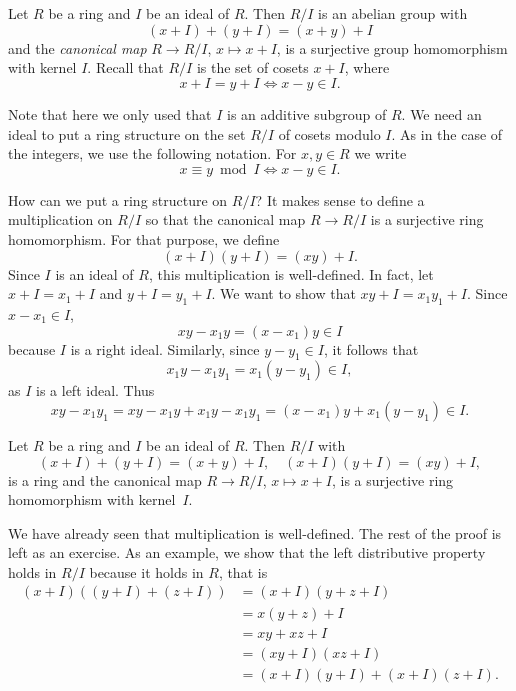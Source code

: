 \section{}

Let $R$ be a ring and $I$ be an ideal of $R$. 
Then $R/I$ is an abelian group
with 
\[
(x+I)+(y+I)=(x+y)+I
\]
and the 
\emph{canonical map} 
$R\to R/I$, $x\mapsto x+I$,
is a surjective group homomorphism with kernel $I$. Recall that 
$R/I$ is the set of cosets $x+I$, where 
\[
x+I=y+I\Longleftrightarrow x-y\in I.
\]

Note that here we only used
that $I$ is an additive subgroup of $R$. We need an ideal to put a ring structure
on the set $R/I$ of cosets modulo $I$. As in the case of the integers, 
we use the following notation. For $x,y\in R$ 
we write 
\[
x\equiv y\bmod I\Longleftrightarrow x-y\in I.
\]

How can we put a ring structure on $R/I$? It makes sense
to define a multiplication on $R/I$ so that
the canonical map $R\to R/I$ is a surjective ring homomorphism. For that purpose, 
we define 
\[
(x+I)(y+I)=(xy)+I.
\]
Since $I$ is an ideal of $R$, this multiplication is well-defined. In fact, let 
$x+I=x_1+I$ and $y+I=y_1+I$. We want to show that
$xy+I=x_1y_1+I$. Since $x-x_1\in I$, 
\[
xy-x_1y=(x-x_1)y\in I
\]
because $I$ is a right ideal. Similarly, since $y-y_1\in I$, it follows that 
\[
x_1y-x_1y_1=x_1(y-y_1)\in I,
\]
as $I$ is a left ideal. Thus
\[
xy-x_1y_1=xy-x_1y+x_1y-x_1y_1=(x-x_1)y+x_1(y-y_1)\in I.
\]

\begin{theorem}
\label{thm:quotient_ring}
	Let $R$ be a ring and $I$ be an ideal of $R$. Then
	$R/I$ with 
	\[
	(x+I)+(y+I)=(x+y)+I,\quad
	(x+I)(y+I)=(xy)+I,
	\]
	is a ring and the canonical map $R\to R/I$, $x\mapsto x+I$, 
	is a surjective ring homomorphism with kernel~$I$. 
\end{theorem}

We have already seen that multiplication is well-defined. 
The rest of the proof is left as an exercise. As an example, we show that 
the left distributive property holds
in $R/I$ because it holds in $R$, that is 
\begin{align*}
    (x+I)\left((y+I)+(z+I)\right) &= (x+I)(y+z+I)\\
    &=x(y+z)+I\\
    &=xy+xz+I\\
    &=(xy+I)(xz+I)\\
    &=(x+I)(y+I)+(x+I)(z+I).
\end{align*}

